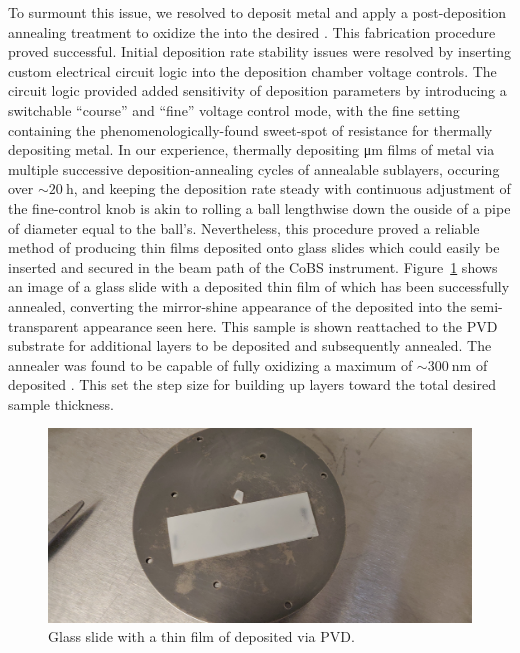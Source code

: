 To surmount this issue, we resolved to deposit  metal and apply a post-deposition annealing treatment to oxidize the  into the desired . This fabrication procedure proved successful. Initial deposition rate stability issues were resolved by inserting custom electrical circuit logic into the deposition chamber voltage controls. The circuit logic provided added sensitivity of deposition parameters by introducing a switchable ``course'' and ``fine'' voltage control mode, with the fine setting containing the phenomenologically-found sweet-spot of resistance for thermally depositing  metal. In our experience, thermally depositing \si{\micro\meter} films of  metal via multiple successive deposition-annealing cycles of annealable sublayers, occuring over \(\sim\SI{20}{\hour}\), and keeping the deposition rate steady with continuous adjustment of the fine-control knob is akin to rolling a ball lengthwise down the ouside of a pipe of diameter equal to the ball's. Nevertheless, this procedure proved a reliable method of producing  thin films deposited onto glass slides which could easily be inserted and secured in the beam path of the \ac{CoBS} instrument. Figure~\ref{fig:Raman:TeO2slide} shows an image of a glass slide with a deposited thin film of  which has been successfully annealed, converting the mirror-shine appearance of the deposited  into the semi-transparent appearance seen here. This sample is shown reattached to the \ac{PVD} substrate for additional layers to be deposited and subsequently annealed. The annealer was found to be capable of fully oxidizing a maximum of \(\sim\SI{300}{\nano\meter}\) of deposited . This set the step size for building up  layers toward the total desired sample thickness.

\begin{figure}[t]
  \centering
  \includegraphics[width=.85\textwidth]{figs/4-Raman/slide-with-TeO2-film-on-substrate.jpeg}
  \caption{Glass slide with a thin film of  deposited via \ac{PVD}.}
  \label{fig:Raman:TeO2slide}
\end{figure}

